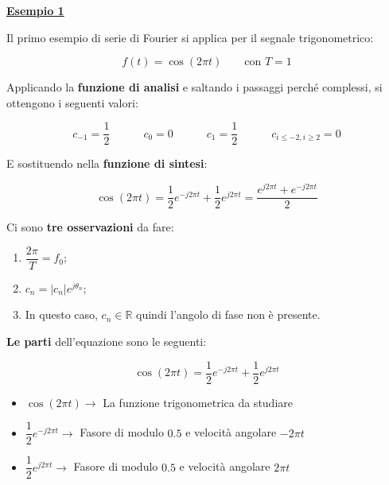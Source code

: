 \documentclass[a4paper]{article}
\begin{document}
	\newpage
	
	\noindent
	\textcolor{Green4}{\textbf{\underline{Esempio 1}}}\newline
	
	\noindent
	Il primo esempio di serie di Fourier si applica per il segnale trigonometrico:
	
	\begin{equation*}
		f\left(t\right) = \cos\left(2 \pi t\right) \hspace{2em} \text{con } T = 1
	\end{equation*}

	\noindent
	Applicando la \textbf{funzione di analisi} e saltando i passaggi perché complessi, si ottengono i seguenti valori:
	
	\begin{equation*}
		c_{-1} = \dfrac{1}{2} \hspace{3em}
		c_{0} = 0 \hspace{3em}
		c_{1} = \dfrac{1}{2} \hspace{3em}
		c_{i \le -2, i \ge 2} = 0
	\end{equation*}

	\noindent
	E sostituendo nella \textbf{funzione di sintesi}:
	
	\begin{equation*}
		\cos\left(2 \pi t\right) = \dfrac{1}{2} e^{-j 2 \pi t} + \dfrac{1}{2} e^{j 2 \pi t} = \dfrac{e^{j 2 \pi t} + e^{-j 2 \pi t}}{2}
	\end{equation*}

	\noindent
	Ci sono \textbf{tre osservazioni} da fare:
	
	\begin{enumerate}[label=\Roman*.]
		\item $\dfrac{2\pi}{T} = f_{0}$;
		
		\item $c_{n} = |c_{n}| e^{j\theta_{n}}$;
		
		\item In questo caso, $c_{n} \in \mathbb{R}$ quindi l'angolo di fase non è presente.
	\end{enumerate}

	\noindent
	\textbf{Le parti} dell'equazione sono le seguenti:
	
	\begin{equation*}
		\cos{\left(2 \pi t\right)} = \dfrac{1}{2} e^{-j 2 \pi t} + \dfrac{1}{2} e^{j 2 \pi t}
	\end{equation*}

	\begin{itemize}[label=]
		\item $\cos{\left(2 \pi t\right)} \rightarrow$ La funzione trigonometrica da studiare
		
		\item $\dfrac{1}{2} e^{-j 2 \pi t} \rightarrow$ Fasore di modulo $0.5$ e velocità angolare $-2\pi t$
		
		\item $\dfrac{1}{2} e^{j 2 \pi t} \rightarrow$ Fasore di modulo $0.5$ e velocità angolare $2\pi t$
	\end{itemize}
\end{document}
